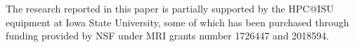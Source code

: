 \documentclass[sigplan,screen,review,anonymous]{acmart}
\begin{document}



\begin{acks}
The research reported in this paper is partially supported by the HPC@ISU equipment at Iowa State University, some of which has been purchased through funding provided by NSF under MRI grants number 1726447 and 2018594.
\end{acks}

\newpage

\nocite{*}


\end{document}
